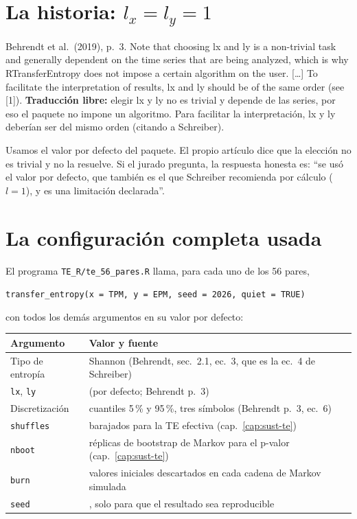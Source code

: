 \documentclass[11pt,openany]{book}
\newcommand{\archivo}[1]{\texttt{\small #1}}
\begin{document}
\section{La historia: $l_x = l_y = 1$}

\begin{cita}{Behrendt et al.\ (2019), p.~3.}
Note that choosing lx and ly is a non-trivial task and generally dependent on the time series that are being analyzed, which is why RTransferEntropy does not impose a certain algorithm on the user. [\dots] To facilitate the interpretation of results, lx and ly should be of the same order (see [1]).
\tcblower
\textbf{Traducción libre:} elegir lx y ly no es trivial y depende de las series, por eso el paquete no impone un algoritmo. Para facilitar la interpretación, lx y ly deberían ser del mismo orden (citando a Schreiber).
\end{cita}

\begin{ojo}[Ojo: $l_x = l_y = 1$ es el valor por defecto, no una elección optimizada]
Usamos el valor por defecto del paquete. El propio artículo dice que la elección no es trivial y no la resuelve. Si el jurado pregunta, la respuesta honesta es: ``se usó el valor por defecto, que también es el que Schreiber recomienda por cálculo ($l=1$), y es una limitación declarada''.
\end{ojo}

\section{La configuración completa usada}

El programa \archivo{TE\_R/te\_56\_pares.R} llama, para cada uno de los 56 pares,
\begin{center}
\texttt{transfer\_entropy(x = TPM, y = EPM, seed = 2026, quiet = TRUE)}
\end{center}
con todos los demás argumentos en su valor por defecto:

\begin{center}\small
\begin{tabular}{>{\raggedright}p{4.2cm}>{\raggedright\arraybackslash}p{9.8cm}}
\toprule
Argumento & Valor y fuente \\
\midrule
Tipo de entropía & Shannon (Behrendt, sec.~2.1, ec.~3, que es la ec.~4 de Schreiber) \\
\texttt{lx}, \texttt{ly} & 1 (por defecto; Behrendt p.~3) \\
Discretización & cuantiles 5\,\% y 95\,\%, tres símbolos (Behrendt p.~3, ec.~6) \\
\texttt{shuffles} & 100 barajados para la TE efectiva (cap.~\ref{cap:sust-te}) \\
\texttt{nboot} & 300 réplicas de bootstrap de Markov para el p-valor (cap.~\ref{cap:sust-te}) \\
\texttt{burn} & 50 valores iniciales descartados en cada cadena de Markov simulada \\
\texttt{seed} & 2026, solo para que el resultado sea reproducible \\
\bottomrule
\end{tabular}
\end{center}
\end{document}
